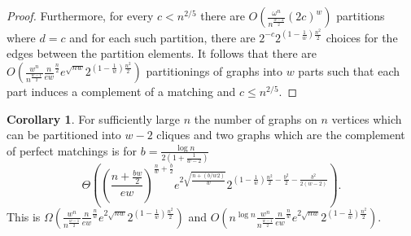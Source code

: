 \documentclass[12pt]{article}
\theoremstyle{definition}
\newtheorem{corollary}[theorem]{Corollary}
\begin{document}
\begin{proof}
Furthermore, for every $c<n^{2/5}$ there are $O(\frac{\omega^n}{n^\frac{w-2}{2}}(2c)^w)$ partitions where $d=c$ and for each such partition,
there are $2^{-c}2^{(1-\frac{1}{w})\frac{n^2}{2}}$ choices for the edges between the partition elements. It follows that there are 
$O (\frac{w^n}{n^\frac{w-1}{2}}\frac{n}{ew}^\frac{n}{2}e^{\sqrt{nw}}2^{(1-\frac{1}{w})\frac{n^2}{2}})$ partitionings of graphs into $w$ parts such that each part induces a complement of a matching and $c \le  n^{2/5}$. 
\end{proof}



\begin{corollary}\label{cpmcounttwo}
For sufficiently large $n$ the number of graphs on $n$ vertices which can be partitioned into $w-2$ cliques and two graphs which  are the complement of perfect matchings 
is for $b=\frac{\log n}{2(1+\frac{1}{w-2})}$
$$\Theta\left((\frac{n+\frac{bw}{2}}{ew})^{\frac{n}{w}+\frac{b}{2}}e^{2\sqrt{\frac{n+(b/w2)}{w}}}2^{(1-\frac{1}{w})\frac{n^2}{2}-\frac{b^2}{2}-\frac{b^2}{2(w-2)}}\right).$$
 This is $\Omega(\frac{w^n}{n^\frac{w-1}{2}}\frac{n}{ew}^\frac{n}{w}e^{2\sqrt{{n}{w}}}2^{(1-\frac{1}{w})\frac{n^2}{2}})$ and
$O(n^{\log n}\frac{w^n}{n^\frac{w-1}{2}}\frac{n}{ew}^\frac{n}{w}e^{2\sqrt{{n}{w}}}2^{(1-\frac{1}{w})\frac{n^2}{2}})$. 

\end{corollary}
\end{document}
